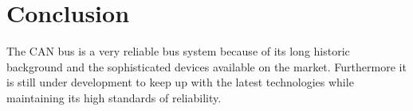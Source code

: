 \section{Conclusion}
The CAN bus is a very reliable bus system because of its long historic
background and the sophisticated devices available on the market. Furthermore it
is still under development to keep up with the latest technologies while
maintaining its high standards of reliability.

